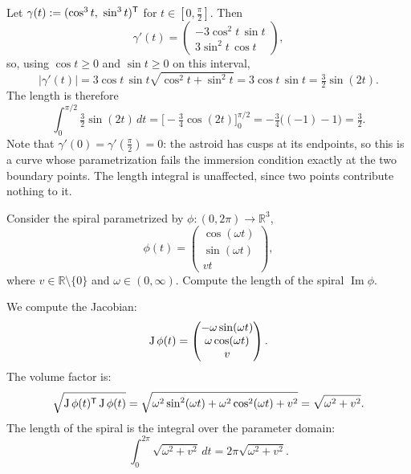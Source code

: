 \begin{example}
\label{ex:astroid_arc_length}
Let $\gamma(t) := (\cos^3t,\ \sin^3t)^{\mathsf{T}}$ for $t \in [0,\tfrac\pi2]$. Then
\[\gamma'(t) = \begin{pmatrix} -3\cos^2t\,\sin t \\ 3\sin^2t\,\cos t\end{pmatrix},\]
so, using $\cos t \geq 0$ and $\sin t \geq 0$ on this interval,
\[|\gamma'(t)| = 3\cos t\,\sin t\sqrt{\cos^2t+\sin^2t} = 3\cos t\,\sin t
  = \tfrac32\sin(2t).\]
The length is therefore
\[\int_0^{\pi/2}\tfrac32\sin(2t)\,dt = \Big[-\tfrac34\cos(2t)\Big]_0^{\pi/2}
  = -\tfrac34\big((-1)-1\big) = \tfrac32.\]
Note that $\gamma'(0) = \gamma'(\tfrac\pi2) = 0$: the astroid has cusps at its endpoints, so this
is a curve whose parametrization fails the immersion condition exactly at the two boundary
points. The length integral is unaffected, since two points contribute nothing to it.
\end{example}

\begin{example}
\label{ex:spiral_length}
Consider the spiral parametrized by $\phi : (0,2\pi) \to \mathbb{R}^3$,
\[\phi(t) = \begin{pmatrix} \cos(\omega t) \\ \sin(\omega t) \\ vt \end{pmatrix},\]
where $v \in \mathbb{R}\setminus\{0\}$ and $\omega \in (0,\infty)$. Compute the length of the spiral $\operatorname{Im}\phi$.

We compute the Jacobian:
\[\operatorname{J}\phi(t) = \begin{pmatrix} -\omega\sin(\omega t) \\ \omega\cos(\omega t) \\ v \end{pmatrix}.\]
The volume factor is:
\[\sqrt{\operatorname{J}\phi(t)^{\mathsf{T}} \operatorname{J}\phi(t)} = \sqrt{\omega^2\sin^2(\omega t) + \omega^2\cos^2(\omega t) + v^2} = \sqrt{\omega^2 + v^2}.\]
The length of the spiral is the integral over the parameter domain:
\[\int_0^{2\pi} \sqrt{\omega^2 + v^2} \,dt = 2\pi\sqrt{\omega^2 + v^2}.\]
\end{example}

